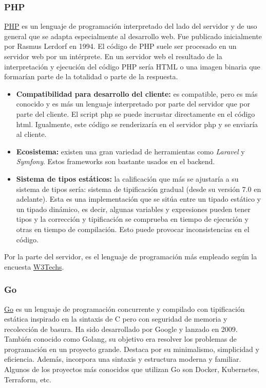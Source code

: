 \subsubsection{\MakeUppercase{Php}}

\href{https://es.wikipedia.org/w/index.php?title=PHP&oldid=161463562}{PHP} es un lenguaje de programación interpretado del lado del servidor y de uso general que se adapta especialmente al desarrollo web. Fue publicado inicialmente por Rasmus Lerdorf en 1994. El código de PHP suele ser procesado en un servidor web por un intérprete. En un servidor web el resultado de la interpretación y ejecución del código PHP sería HTML o una imagen binaria que formarían parte de la totalidad o parte de la respuesta.

\begin{itemize}
    \item[\mal] \textbf{Compatibilidad para desarrollo del cliente:} es compatible, pero es más conocido y es más un lenguaje interpretado por parte del servidor que por parte del cliente. El script php se puede incrustar directamente en el código html. Igualmente, este código se renderizaría en el servidor php y se enviaría al cliente.
    \item[\bien] \textbf{Ecosistema:} existen una gran variedad de herramientas como \textit{Laravel} y \textit{Symfony}. Estos frameworks son bastante usados en el backend.
    \item[\bien] \textbf{Sistema de tipos estáticos:} la calificación que más se ajustaría a su sistema de tipos sería: sistema de tipificación gradual (desde su versión 7.0 en adelante). Esta es una implementación que se sitúa entre un tipado estático y un tipado dinámico, es decir, algunas variables y expresiones pueden tener tipos y la corrección y tipificación se comprueba en tiempo de ejecución y otras en tiempo de compilación. Esto puede provocar inconsistencias en el código.
\end{itemize}

Por la parte del servidor, es el lenguaje de programación más empleado según la encuesta \href{https://w3techs.com/technologies/overview/programming_language}{W3Techs}.

\subsubsection{Go}

\href{https://es.wikipedia.org/w/index.php?title=Go_(lenguaje_de_programaci%C3%B3n)&oldid=158783243}{Go} es un lenguaje de programación concurrente y compilado con tipificación estática inspirado en la sintaxis de C pero con seguridad de memoria y recolección de basura. Ha sido desarrollado por Google y lanzado en 2009. También conocido como Golang, su objetivo era resolver los problemas de programación en un proyecto grande. Destaca por su minimalismo, simplicidad y eficiencia. Además, incorpora una sintaxis y estructura moderna y familiar. Algunos de los proyectos más conocidos que utilizan Go son Docker, Kubernetes, Terraform, etc.

